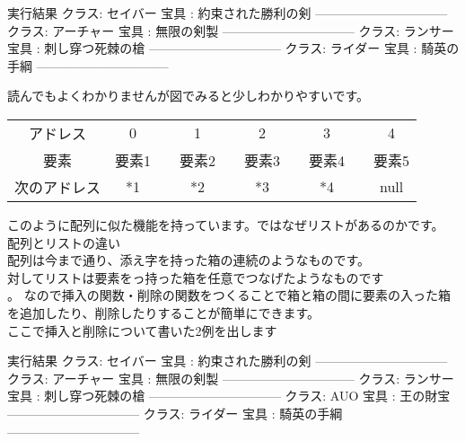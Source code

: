 \begin{itembox}{実行結果}
クラス: セイバー
宝具 : 約束された勝利の剣
--------------------------------
クラス: アーチャー
宝具 : 無限の剣製
--------------------------------
クラス: ランサー
宝具 : 刺し穿つ死棘の槍
--------------------------------
クラス: ライダー
宝具 : 騎英の手綱
--------------------------------
\end{itembox}
読んでもよくわかりませんが図でみると少しわかりやすいです。
\begin{table}[htb]
\begin{center}
\begin{tabular}{|c|c|c|c|c|c|c|c|c|c|}
\cline{1-1}\cline{2-2}\cline{4-4}\cline{6-6}\cline{8-8}\cline{10-10}
アドレス & 0 && 1 && 2 && 3 && 4 \\ \cline{1-1}\cline{2-2}\cline{4-4}\cline{6-6}\cline{8-8}\cline{10-10}
要素 & 要素1 && 要素2 && 要素3 && 要素4 && 要素5\\ \cline{1-1}\cline{2-2}\cline{4-4}\cline{6-6}\cline{8-8}\cline{10-10}
次のアドレス & *1 && *2 && *3 && *4 && null   \\ 
\cline{1-1}\cline{2-2}\cline{4-4}\cline{6-6}\cline{8-8}\cline{10-10}
\end{tabular}
\end{center}
\end{table}
このように配列に似た機能を持っています。ではなぜリストがあるのかです。\\
配列とリストの違い\\
配列は今まで通り、添え字を持った箱の連続のようなものです。\\
対してリストは要素をっ持った箱を任意でつなげたようなものです\\。
なので挿入の関数・削除の関数をつくることで箱と箱の間に要素の入った箱を追加したり、削除したりすることが簡単にできます。\\

ここで挿入と削除について書いた2例を出します

\begin{itembox}{実行結果}
クラス: セイバー
宝具 : 約束された勝利の剣
--------------------------------
クラス: アーチャー
宝具 : 無限の剣製
--------------------------------
クラス: ランサー
宝具 : 刺し穿つ死棘の槍
--------------------------------
クラス: AUO
宝具 : 王の財宝
--------------------------------
クラス: ライダー
宝具 : 騎英の手綱
--------------------------------
\end{itembox}

